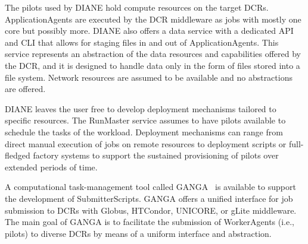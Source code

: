 \documentclass{sig-alternate}
\begin{document}
 


The pilots used by DIANE hold compute resources on the target DCRs.
ApplicationAgents are executed by the DCR middleware as jobs with mostly one
core but possibly more. DIANE also offers a data service with a dedicated API
and CLI that allows for staging files in and out of ApplicationAgents. This
service represents an abstraction of the data resources and capabilities offered
by the DCR, and it is designed to handle data only in the form of files stored
into a file system. Network resources are assumed to be available and no
abstractions are offered.


DIANE leaves the user free to develop deployment mechanisms tailored to specific
resources. The RunMaster service assumes to have pilots available to schedule
the tasks of the workload. Deployment mechanisms can range from direct manual
execution of jobs on remote resources to deployment scripts or full-fledged
factory systems to support the sustained provisioning of pilots over extended
periods of time.

A computational task-management tool called
GANGA~\cite{moscicki2009ganga,ganga_url} is available to support the development
of SubmitterScripts. GANGA offers a unified interface for job submission to DCRs
with Globus, HTCondor, UNICORE, or gLite middleware. The main goal of GANGA is
to facilitate the submission of WorkerAgents (i.e., pilots) to diverse DCRs by
means of a uniform interface and abstraction.
\end{document}

